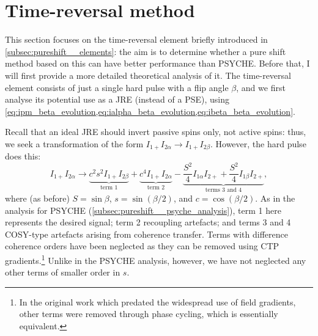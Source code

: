 \section{Time-reversal method}
\label{sec:pureshift__timerev}

This section focuses on the time-reversal element briefly introduced in \cref{subsec:pureshift__elements}: the aim is to determine whether a pure shift method based on this can have better performance than PSYCHE.
Before that, I will first provide a more detailed theoretical analysis of it.
The time-reversal element consists of just a single hard pulse with a flip angle $\beta$, and we first analyse its potential use as a JRE (instead of a PSE), using \cref{eq:ipm_beta_evolution,eq:ialpha_beta_evolution,eq:ibeta_beta_evolution}.

Recall that an ideal JRE should invert passive spins only, not active spins: thus, we seek a transformation of the form $I_{1+}I_{2\alpha} \to I_{1+}I_{2\beta}$.
However, the hard pulse does this:
\begin{equation}
    \label{eq:beta_pulse_not_jre}
    I_{1+}I_{2\alpha} \to
    {\underbrace{c^2s^2 I_{1+}I_{2\beta}}_{\text{term 1}}}
    + {\underbrace{c^4 I_{1+}I_{2\alpha}}_{\text{term 2}}}
    - {\underbrace{\frac{S^2}{4}I_{1\alpha}I_{2+} + \frac{S^2}{4}I_{1\beta}I_{2+}}_{\text{terms 3 and 4}}},
\end{equation}
where (as before) $S = \sin\beta$, $s = \sin(\beta/2)$, and $c = \cos(\beta/2)$.
As in the analysis for PSYCHE (\cref{subsec:pureshift__psyche_analysis}), term 1 here represents the desired signal; term 2 recoupling artefacts; and terms 3 and 4 COSY-type artefacts arising from coherence transfer.
Terms with difference coherence orders have been neglected as they can be removed using CTP gradients.\footnote{In the original work\autocite{Sorensen1985JACS} which predated the widespread use of field gradients, other terms were removed through phase cycling, which is essentially equivalent.}
Unlike in the PSYCHE analysis, however, we have not neglected any other terms of smaller order in $s$.

